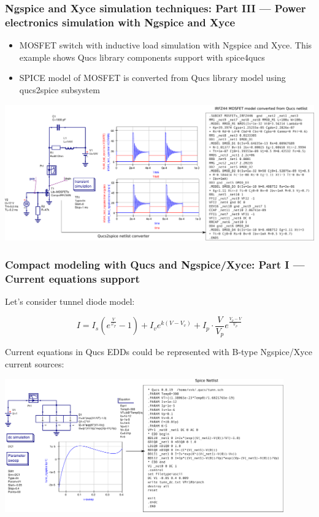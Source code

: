 \documentclass[9pt]{beamer}
\begin{document}
\begin{frame}
 \frametitle{Ngspice and Xyce simulation techniques: Part III --- Power 
electronics simulation with Ngspice and Xyce}

\begin{itemize}
 \item MOSFET switch with inductive load simulation with Ngspice and Xyce.  
This example shows Qucs library components support with spice4qucs
 \item SPICE model of MOSFET is converted from Qucs library model using 
qucs2spice subsystem
\end{itemize}

 

 \includegraphics[width=1\textwidth]{img/irfz44.pdf}
 

\end{frame}


\begin{frame}
 \frametitle{Compact modeling with Qucs and Ngspice/Xyce: Part I --- Current 
equations support}

Let's consider tunnel diode model:

\begin{equation}
 I = I_s\left(e^{\frac{V}{\varphi_T}}-1\right) + I_ve^{k(V-V_v)} + 
     I_p\cdot\frac{V}{V_p}e^{\frac{V_p-V}{V_p}} \label{eq:tun}
\end{equation}

Current equations in Qucs EDDs could be represented with B-type Ngspice/Xyce 
current sources:

\includegraphics[width=0.9\textwidth]{img/tunn.pdf}

\end{frame}
\end{document}
